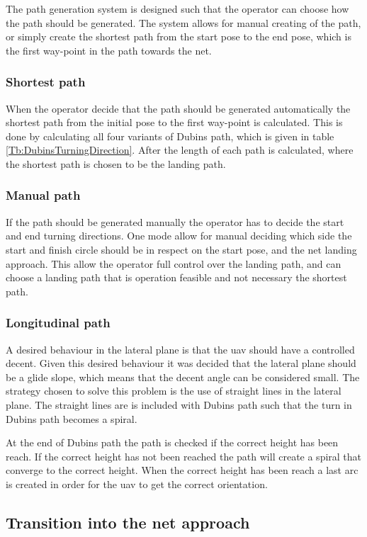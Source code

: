 The path generation system is designed such that the operator can choose how the path should be generated. The system allows for manual creating of the path, or simply create the shortest path from the start pose to the end pose, which is the first way-point in the path towards the net.
\subsubsection{Shortest path}
When the operator decide that the path should be generated automatically the shortest path from the initial pose to the first way-point is calculated. This is done by calculating all four variants of Dubins path, which is given in table \ref{Tb:DubinsTurningDirection}. After the length of each path is calculated, where the shortest path is chosen to be the landing path.
\subsubsection{Manual path}
If the path should be generated manually the operator has to decide the start and end turning directions.
One mode allow for manual deciding which side the start and finish circle should be in respect on the start pose, and the net landing approach. This allow the operator full control over the landing path, and can choose a landing path that is operation feasible and not necessary the shortest path.
\subsubsection{Longitudinal path}
A desired behaviour in the lateral plane is that the \gls{uav} should have a controlled decent. Given this desired behaviour it was decided that the lateral plane should be a glide slope, which means that the decent angle can be considered small. The strategy chosen to solve this problem is the use of straight lines in the lateral plane. The straight lines are is included with Dubins path such that the turn in Dubins path becomes a spiral.

At the end of Dubins path the path is checked if the correct height has been reach. If the correct height has not been reached the path will create a spiral that converge to the correct height. When the correct height has been reach a last arc is created in order for the \gls{uav} to get the correct orientation.
\subsection{Transition into the net approach}
